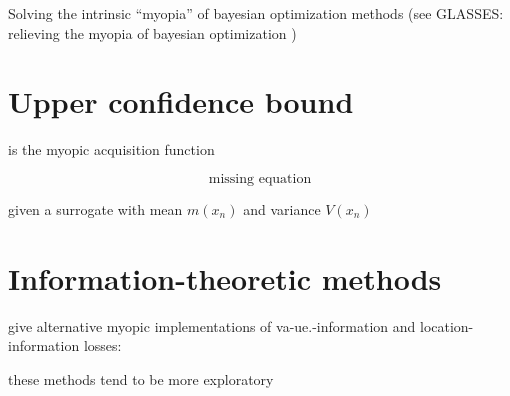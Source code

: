 \documentclass[b5paper]{report}
\begin{document}
Solving the intrinsic ``myopia'' of bayesian optimization methods (see GLASSES:
relieving the myopia of bayesian optimization \cite{gonzalez2016glasses})


\section{Upper confidence bound}

is the myopic acquisition function


\begin{equation}
  \text{missing equation}
\end{equation}

given a surrogate with mean $m(x_n)$ and variance $V(x_n)$


\section{Information-theoretic methods}

give alternative myopic implementations of va-ue.-information and
location-information losses:


these methods tend to be more exploratory
\end{document}
